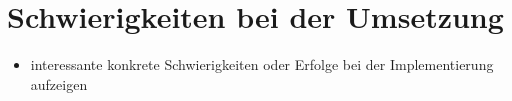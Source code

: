 \documentclass[../main/thesis.tex]{subfiles}
\begin{document}
\section{Schwierigkeiten bei der Umsetzung}
\label{ch:impl-difficulties}






\begin{itemize}
	\item interessante konkrete Schwierigkeiten oder Erfolge bei der Implementierung aufzeigen
\end{itemize}



\onlyinsubfile{\listoffigures}
\onlyinsubfile{}
\end{document}
